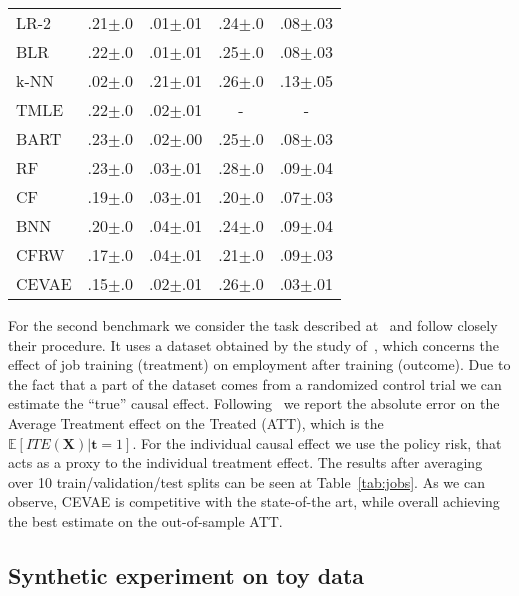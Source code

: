 \documentclass{article}
\def\*#1{\mathbf{#1}}
\begin{document}
\begin{table}[htb!]
\begin{minipage}{.45\linewidth}
\begin{adjustbox}{max width=\linewidth}
\begin{tabular}{lcccc}
LR-2 & .21$\pm$.0 & .01$\pm$.01 & .24$\pm$.0 & .08$\pm$.03\\
BLR & .22$\pm$.0 & .01$\pm$.01 & .25$\pm$.0 & .08$\pm$.03 \\
k-NN & .02$\pm$.0 & .21$\pm$.01 & .26$\pm$.0 & .13$\pm$.05\\
TMLE & .22$\pm$.0 & .02$\pm$.01 & - & - \\
BART & .23$\pm$.0 & .02$\pm$.00 & .25$\pm$.0 & .08$\pm$.03 \\
RF & .23$\pm$.0 & .03$\pm$.01 & .28$\pm$.0 & .09$\pm$.04 \\
CF & .19$\pm$.0 & .03$\pm$.01 & .20$\pm$.0 & .07$\pm$.03 \\
BNN & .20$\pm$.0 & .04$\pm$.01 & .24$\pm$.0 & .09$\pm$.04 \\
CFRW &.17$\pm$.0 & .04$\pm$.01 & .21$\pm$.0 & .09$\pm$.03\\\midrule
CEVAE & .15$\pm$.0 & .02$\pm$.01 & .26$\pm$.0 & .03$\pm$.01\\
\bottomrule
\end{tabular}\end{adjustbox}
\end{minipage}
\end{table}

For the second benchmark we consider the task described at~\cite{shalit2016estimating} and follow closely their procedure. It uses a dataset obtained by the study of~\cite{lalonde1986evaluating,smith2005does}, which concerns the effect of job training (treatment) on employment after training (outcome). Due to the fact that a part of the dataset comes from a randomized control trial we can estimate the ``true'' causal effect. Following~\cite{shalit2016estimating} we report the absolute error on the Average Treatment effect on the Treated (ATT), which is the $\mathbb{E}\left[ITE(\*X)|\*t=1\right]$. For the individual causal effect we use the policy risk, that acts as a proxy to the individual treatment effect. The results after averaging over 10 train/validation/test splits can be seen at Table~\ref{tab:jobs}. As we can observe, CEVAE is competitive with the state-of-the art, while overall achieving the best estimate on the out-of-sample ATT.


\subsection{Synthetic experiment on toy data}
\end{document}
